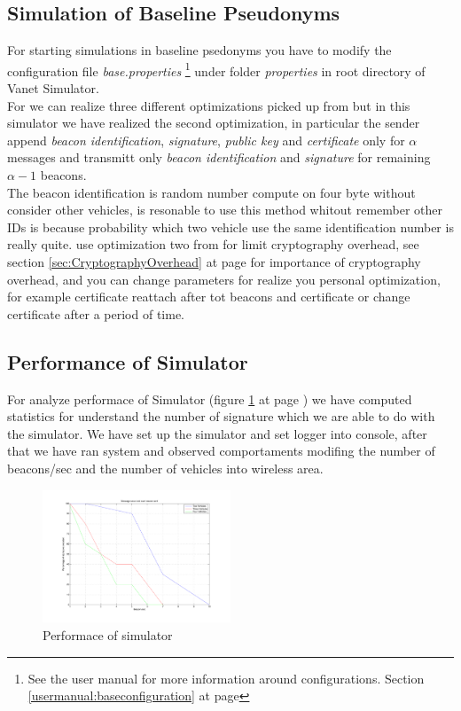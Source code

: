 \subsection{Simulation of Baseline Pseudonyms}
For starting simulations in baseline psedonyms you have to modify the configuration file \textit{base.properties} \footnote{See the user manual for more information around configurations. Section \ref{usermanual:baseconfiguration} at page \pageref{usermanual:baseconfiguration}} under folder \textit{properties} in root directory of Vanet Simulator.\\
For \baseline we can realize three different optimizations picked up from \cite{calandriello} but in this simulator we have realized the second optimization, in particular the sender append \textit{beacon identification}, \textit{signature}, \textit{public key} and \textit{certificate} only for $\alpha$ messages and transmitt only \textit{beacon identification} and \textit{signature} for remaining $\alpha-1$ beacons. \\
The beacon identification is random number compute on four byte without consider other vehicles, is resonable to use this method whitout remember other IDs is because probability which two vehicle use the same identification number is really quite.
\baseline use optimization two from \cite{calandriello} for limit cryptography overhead, see section \ref{sec:CryptographyOverhead} at page \pageref{sec:CryptographyOverhead} for importance of cryptography overhead, and you can change parameters for realize you personal optimization, for example certificate reattach after tot beacons and certificate or change certificate after a period of time.
\subsection{Performance of Simulator}
For analyze performace of Simulator (figure \ref{fig:performance} at page \pageref{fig:performance}) we have computed statistics for understand the number of signature which we are able to do with the simulator. We have set up the \baseline simulator and set logger into console, after that we have ran system and observed comportaments modifing the number of beacons/sec and the number of vehicles into wireless area.
\begin{figure}[ht]
\centerline{\includegraphics[width=0.5\textwidth]{chart_baseline.pdf}}
\caption{Performace of simulator}
\label{fig:performance}
\end{figure}
